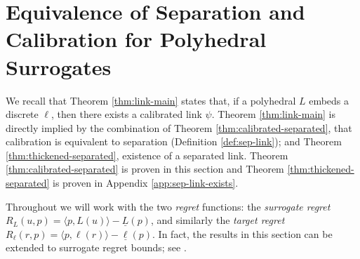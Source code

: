 \documentclass[11pt]{article}
\newcommand{\risk}[1]{\underline{#1}}
\newcommand{\inprod}[2]{\langle #1, #2 \rangle}%
\begin{document}
\section{Equivalence of Separation and Calibration for Polyhedral Surrogates}
\label{sec:equiv-sep-calib}

We recall that Theorem \ref{thm:link-main} states that, if a polyhedral $L$ embeds a discrete $\ell$, then there exists a calibrated link $\psi$.
Theorem \ref{thm:link-main} is directly implied by the combination of Theorem \ref{thm:calibrated-separated}, that calibration is equivalent to separation (Definition \ref{def:sep-link}); and Theorem \ref{thm:thickened-separated}, existence of a separated link.
Theorem \ref{thm:calibrated-separated} is proven in this section and Theorem \ref{thm:thickened-separated} is proven in Appendix \ref{app:sep-link-exists}.

Throughout we will work with the two \emph{regret} functions:
the \emph{surrogate regret} $R_L(u,p) = \inprod{p}{L(u)} - \risk{L}(p)$, and similarly the \emph{target regret} $R_{\ell}(r,p) = \inprod{p}{\ell(r)} - \risk{\ell}(p)$.
In fact, the results in this section can be extended to surrogate regret bounds; see \citet{frongillo2021surrogate}.
\end{document}
